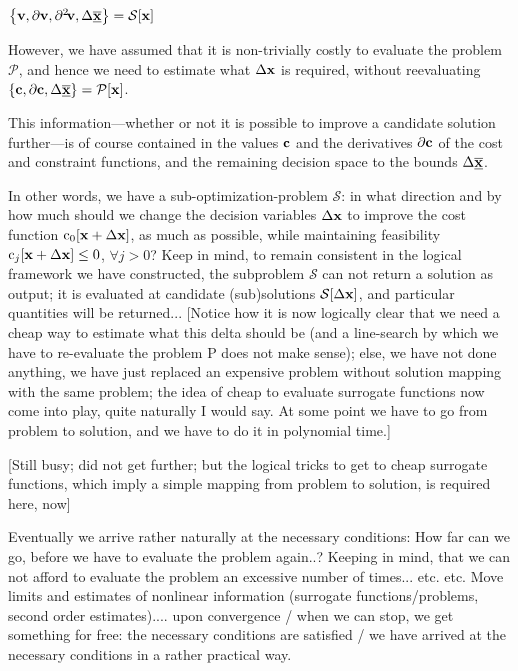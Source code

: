 \documentclass[11pt]{article}
\begin{document}
 $\left\{\mathbf{v}, \partial \mathbf{v}, \partial^2\!\mathbf{ v},   \Delta \underline{\overline{\mathbf{x}}}\right\}=\mathcal{S}[\mathbf{x}]$ 



However, we have assumed that it is non-trivially costly to evaluate the problem $\mathcal{P}$, and hence we need to estimate what $\Delta\mathbf{x}$ is required, without reevaluating $\left\{\mathbf{c}, \partial \mathbf{c}, \Delta \underline{\overline{\mathbf{x}}}\right\}=\mathcal{P}[\mathbf{x}]$. 


This information---whether or not it is possible to improve a candidate solution further---is of course contained in the values $\mathbf{c}$ and the derivatives $\mathbf{\partial c}$ of the cost and constraint functions, and the remaining decision space to the bounds $\Delta \underline{\overline{\mathbf{x}}}$.

In other words, we have a sub-optimization-problem $\mathcal{S}$: in what direction and by how much should we change the decision variables $\Delta \mathbf{x}$ to improve the cost function $\textrm{c}_0[\mathbf{x} + \Delta \mathbf{x}]$, as much as possible, while maintaining feasibility $\textrm{c}_j[\mathbf{x} + \Delta \mathbf{x}] \leq 0$, $\forall j > 0 $? Keep in mind, to remain consistent in the logical framework we have constructed, the subproblem $\mathcal{S}$ can not return a solution as output; it is evaluated at candidate (sub)solutions $\mathcal{S}[\Delta \mathbf{x}]$, and particular quantities will be returned... [Notice how it is now logically clear that we need a cheap way to estimate what this delta should be (and a line-search by which we have to re-evaluate the problem P does not make sense); else, we have not done anything, we have just replaced an expensive problem without solution mapping with the same problem; the idea of cheap to evaluate surrogate functions now come into play, quite naturally I would say. At some point we have to go from problem to solution, and we have to do it in polynomial time.]

[Still busy; did not get further; but the logical tricks to get to cheap surrogate functions, which imply a simple mapping from problem to solution, is required here, now]

Eventually we arrive rather naturally at the necessary conditions: How far can we go, before we have to evaluate the problem again..? Keeping in mind, that we can not afford to evaluate the problem an excessive number of times... etc. etc. Move limits and estimates of nonlinear information (surrogate functions/problems, second order estimates).... upon convergence / when we can stop, we get something for free: the necessary conditions are satisfied / we have arrived at the necessary conditions in a rather practical way.


 
 
\end{document}
